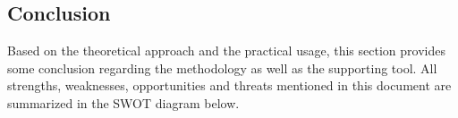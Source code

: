 
\subsection{Conclusion}
\label{sec:approachconclusion}
Based on the theoretical approach and the practical usage, this section provides some conclusion regarding the methodology as well as the supporting tool.
All strengths, weaknesses, opportunities and threats mentioned in this document are summarized in the SWOT diagram below.


\begin{table}[h]
\caption{SWOT Analysis}
\label{SWOT Analysis}
\end{table}
